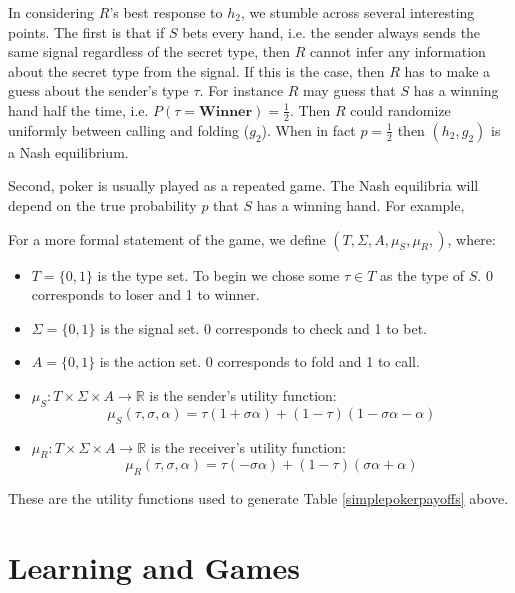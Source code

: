\documentclass{article}
\begin{document}
In considering $R$'s best response to $h_2$, we stumble across several interesting points. The first is that if $S$ bets every hand, i.e. the sender always sends the same signal regardless of the secret type, then $R$ cannot infer any information about the secret type from the signal. If this is the case, then $R$ has to make a guess about the sender's type $\tau$. For instance $R$ may guess that $S$ has a winning hand half the time, i.e. $P(\tau = \textbf{Winner}) = \frac{1}{2}$. Then $R$ could randomize uniformly between calling and folding ($g_2$). When in fact $p = \frac{1}{2}$ then $(h_2, g_2)$ is a Nash equilibrium.

Second, poker is usually played as a repeated game. The Nash equilibria will depend on the true probability $p$ that $S$ has a winning hand. For example,

For a more formal statement of the game, we define $\left(T, \Sigma, A, \mu_S, \mu_R, \right)$, where:
\begin{itemize}
	\item $T = \lbrace 0, 1 \rbrace$ is the type set. To begin we chose some $\tau \in T$ as the type of $S$. 0 corresponds to loser and 1 to winner.
	\item $\Sigma = \lbrace 0, 1 \rbrace$ is the signal set. 0 corresponds to check and 1 to bet.
		\item $A = \lbrace 0, 1 \rbrace$ is the action set. 0 corresponds to fold and 1 to call.
	\item $\mu_S: T \times \Sigma \times A \longrightarrow \mathbb{R}$ is the sender's utility function:
		\begin{equation}
\mu_S(\tau, \sigma, \alpha) = \tau(1+\sigma\alpha) + (1-\tau)(1-\sigma\alpha-\alpha)
		\end{equation}
	\item $\mu_R: T \times \Sigma \times A \longrightarrow \mathbb{R}$ is the receiver's utility function:
		\begin{equation}
\mu_R(\tau, \sigma, \alpha) = \tau(-\sigma\alpha) + (1-\tau)(\sigma\alpha+\alpha)
		\end{equation}
\end{itemize}

\noindent These are the utility functions used to generate Table \ref{simplepokerpayoffs} above.

\section{Learning and Games}
    
\end{document}
